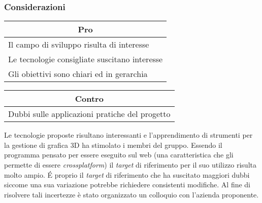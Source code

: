 \subsubsection{Considerazioni}
\begin{minipage}[t]{0.45\linewidth}
    \vspace{0pt}
    {\renewcommand{\arraystretch}{1.5}
    \begin{tabular}{p{1\linewidth}}
        \multicolumn{1}{c}{\textbf{Pro}} \\
        \midrule
		Il campo di sviluppo risulta di interesse \\
		Le tecnologie consigliate suscitano interesse \\
		Gli obiettivi sono chiari ed in gerarchia \\
        \hline
    \end{tabular}
    }
\end{minipage}
\hspace{0.05\linewidth}
\begin{minipage}[t]{0.45\linewidth}
    \vspace{0pt}
    {\renewcommand{\arraystretch}{1.5}
    \begin{tabular}{p{1\linewidth}}
        \multicolumn{1}{c}{\textbf{Contro}} \\
        \midrule
		Dubbi sulle applicazioni pratiche del progetto \\
        \hline
    \end{tabular}
    }
\end{minipage}
\vspace{1em}

Le tecnologie proposte risultano interessanti e l'apprendimento di strumenti per la gestione di grafica 3D ha stimolato i membri del gruppo.
Essendo il programma pensato per essere eseguito sul web (una caratteristica che gli permette di essere \textit{crossplatform}) il \textit{target} di riferimento per il suo utilizzo risulta molto ampio.
\'E proprio il \textit{target} di riferimento che ha suscitato maggiori dubbi siccome una sua variazione potrebbe richiedere consistenti modifiche.
Al fine di risolvere tali incertezze è stato organizzato un colloquio con l'azienda proponente.